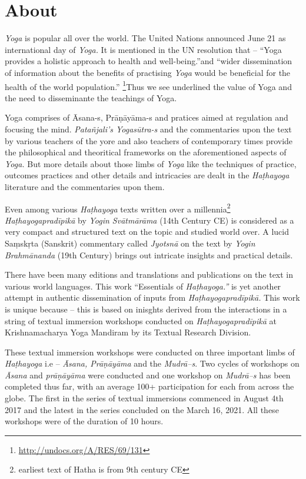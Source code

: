\thispagestyle{empty}

\chapter*{About}\label{about}

\textit{Yoga} is popular all over the world. The United Nations announced June 21 as international day of \textit{Yoga.} It is mentioned in the UN resolution that – “Yoga provides a holistic approach to health and well-being.”and “wider dissemination of information about the benefits of practising \textit{Yoga} would be beneficial for the health of the world population.” \footnote{\url{http://undocs.org/A/RES/69/131}}Thus we see underlined the value of Yoga and the need to disseminante the teachings of Yoga.
\medskip

Yoga comprises of Āsana-s, Prāṇāyāma-s and pratices aimed at regulation and focusing the mind. \textit{Patañjali's Yogasūtra-s} and the commentaries upon the text by various teachers of the yore and also teachers of contemporary times provide the philosophical and theoritical frameworks on the aforementioned aspects of \textit{Yoga.} But more details about those limbs of \textit{Yoga} like the techniques of practice, outcomes practices and other details and intricacies are dealt in the \textit{Haṭhayoga} literature and the commentaries upon them.
\medskip

Even among various \textit{Haṭhayoga} texts written over a millennia\footnote{earliest text of Hatha is from 9th century CE} \textit{Haṭhayogapradīpikā} by \textit{Yogin Svātmārāma} (14th Century CE) is considered as a very compact and structured text on the topic and studied world over. A lucid Saṃskṛta (Sanskrit) commentary called \textit{Jyotsnā} on the text by \textit{Yogin Brahmānanda} (19th Century) brings out intricate insights and practical details. 
\medskip

There have been many editions and translations and publications on the text in various world languages. This work “Essentials of \textit{Haṭhayoga.”} is yet another attempt in authentic dissemination of inputs from \textit{Haṭhayogapradīpikā.} This work is unique because – this is based on inisghts derived from the interactions in a string of textual immersion workshops conducted on \textit{Haṭhayogapradīpikā} at Krishnamacharya Yoga Mandiram by its Textual Research Division. 
\medskip

These textual immersion workshops were conducted on three important limbs of \textit{Haṭhayoga} i.e – \textit{Āsana, Prāṇāyāma} and the \textit{Mudrā–s}. Two cycles of workshops on \textit{Āsana} and \textit{prāṇāyāma} were conducted and one workshop on \textit{Mudrā–s} has been completed thus far, with an average 100+ participation for each from across the globe. The first in the series of textual immersions commenced in August 4th 2017 and the latest in the series concluded on the March 16, 2021. All these workshops were of the duration of 10 hours.
\medskip

